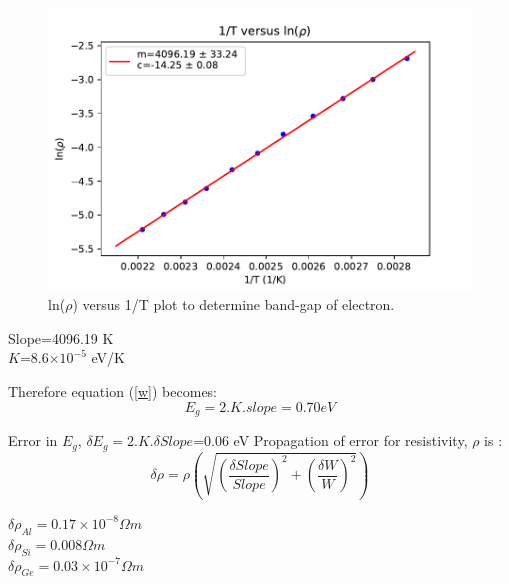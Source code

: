 \documentclass[a4paper, amsfonts, amssymb, amsmath, reprint, showkeys, nofootinbib, twoside]{revtex4-1}
\begin{document}
\begin{figure}[H]
	\centering
	\includegraphics[scale=0.5]{ln}
	\caption{ln($\rho$) versus 1/T plot to determine band-gap of electron.}
	\label{ln}
\end{figure}

\begin{center}
	Slope=4096.19 K\\
	$K$=8.6$\times10^{-5}$ eV/K
\end{center}

Therefore equation (\ref{w}) becomes:
\begin{equation}
	E_g=2.K.slope=0.70 eV
\end{equation}

Error in $E_g$, $\delta E_g=2.K. \delta Slope$=0.06 eV
\newline
\newline
Propagation of error for resistivity, $\rho$ is :
\begin{equation}
	\delta \rho=\rho\left( \sqrt{\left(\frac{ \delta Slope}{Slope}\right)^2+\left(\frac{ \delta W}{W}\right)^2 }\right) 
\end{equation}

\begin{center}
 $\delta \rho_{Al}=0.17\times10^{-8} \Omega m$\\
 $\delta \rho_{Si}=0.008 \Omega m$\\
 $\delta \rho_{Ge}=0.03\times10^{-7} \Omega m$
 
\end{center}
\end{document}
